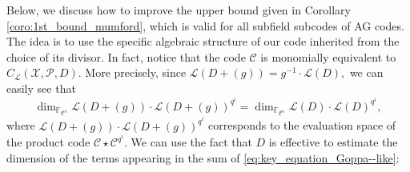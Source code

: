 \documentclass[a4paper]{article}
\theoremstyle{definition}
\theoremstyle{remark}
\newcommand{\calP}{\mathcal{P}}
\newcommand{\calL}{\mathcal{L}}
\newcommand{\calC}{\mathcal{C}}
\newcommand{\calX}{\mathcal{X}}
\newcommand{\fqm}{\mathbb{F}_{q^m}}
\begin{document}
Below, we discuss how to improve the upper bound given in Corollary \ref{coro:1st_bound_mumford}, which is valid for all subfield subcodes of AG codes. The idea is to use the specific algebraic structure of our code inherited from the choice of its divisor.
\noindent In fact, notice that the code $\calC$ is monomially equivalent to $C_{\calL}(\calX,\calP,D)$. 
More precisely, since $\calL(D+(g)) = g^{-1} \cdot \calL(D),$
we can easily see that
\begin{equation} \label{eq:equiv_divisors}
\dim_{\fqm} \calL(D+(g))\cdot \calL(D+(g))^{q^i} = \dim_{\fqm} \calL(D)\cdot \calL(D)^{q^i},
\end{equation}
where $\calL(D+(g))\cdot \calL(D+(g))^{q^i}$ corresponds to the evaluation space of the product code $\calC \star \calC^{q^i}$. We can use the fact that $D$ is effective to estimate the dimension of the terms appearing in the sum of \eqref{eq:key_equation_Goppa--like}:
\end{document}
